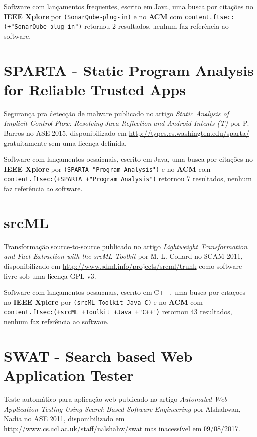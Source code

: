 Software com lançamentos frequentes,
escrito em Java,
uma busca por citações no {\bf IEEE Xplore} por
\texttt{(SonarQube-plug-in)}
e no {\bf ACM} com
\texttt{content.ftsec:(+"SonarQube-plug-in")}
retornou
2 resultados,
nenhum faz referência ao software.



\section{SPARTA - Static Program Analysis for Reliable Trusted Apps}

Segurança pra detecção de malware
publicado no artigo {\it Static Analysis of Implicit Control Flow: Resolving Java Reflection and Android Intents (T)}
por P. Barros
no ASE 2015,
disponibilizado em \url{http://types.cs.washington.edu/sparta/}
gratuitamente
sem uma licença definida.

Software com lançamentos ocsaionais,
escrito em Java,
uma busca por citações no {\bf IEEE Xplore} por
\texttt{(SPARTA "Program Analysis")}
e no {\bf ACM} com
\texttt{content.ftsec:(+SPARTA +"Program Analysis")}
retornou
7 resultados,
nenhum faz referência ao software.



\section{srcML}

Transformação source-to-source
publicado no artigo {\it Lightweight Transformation and Fact Extraction with the srcML Toolkit}
por M. L. Collard
no SCAM 2011,
disponibilizado em \url{http://www.sdml.info/projects/srcml/trunk}
como software livre
sob uma licença GPL v3.

Software com lançamentos ocsaionais,
escrito em C++,
uma busca por citações no {\bf IEEE Xplore} por
\texttt{(srcML Toolkit Java C)}
e no {\bf ACM} com
\texttt{content.ftsec:(+srcML +Toolkit +Java +"C++")}
retornou
43 resultados,
nenhum faz referência ao software.



\section{SWAT - Search based Web Application Tester}

Teste automático para aplicação web
publicado no artigo {\it Automated Web Application Testing Using Search Based Software Engineering}
por Alshahwan, Nadia
no ASE 2011,
disponibilizado em \url{http://www.cs.ucl.ac.uk/staff/nalshahw/swat}
mas inacessível em 09/08/2017.

